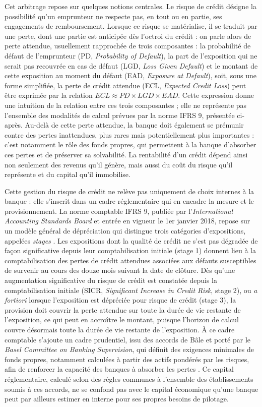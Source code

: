 Cet arbitrage repose sur quelques notions centrales. Le risque de crédit désigne la possibilité qu'un emprunteur ne respecte pas, en tout ou en partie, ses engagements de remboursement. Lorsque ce risque se matérialise, il se traduit par une perte, dont une partie est anticipée dès l'octroi du crédit : on parle alors de perte attendue, usuellement rapprochée de trois composantes : la probabilité de défaut de l'emprunteur (PD, \emph{Probability of Default}), la part de l'exposition qui ne serait pas recouvrée en cas de défaut (LGD, \emph{Loss Given Default}) et le montant de cette exposition au moment du défaut (EAD, \emph{Exposure at Default}), soit, sous une forme simplifiée, la perte de crédit attendue (ECL, \emph{Expected Credit Loss}) peut être exprimée par la relation $ECL \approx PD \times LGD \times EAD$. Cette expression donne une intuition de la relation entre ces trois composantes ; elle ne représente pas l'ensemble des modalités de calcul prévues par la norme IFRS 9, présentée ci-après. Au-delà de cette perte attendue, la banque doit également se prémunir contre des pertes inattendues, plus rares mais potentiellement plus importantes : c'est notamment le rôle des fonds propres, qui permettent à la banque d'absorber ces pertes et de préserver sa solvabilité. La rentabilité d'un crédit dépend ainsi non seulement des revenus qu'il génère, mais aussi du coût du risque qu'il représente et du capital qu'il immobilise.

Cette gestion du risque de crédit ne relève pas uniquement de choix internes à la banque : elle s'inscrit dans un cadre réglementaire qui en encadre la mesure et le provisionnement. La norme comptable \textsc{IFRS 9}, publiée par l'\textit{International Accounting Standards Board} et entrée en vigueur le 1er janvier 2018, repose sur un modèle général de dépréciation qui distingue trois catégories d'expositions, appelées \emph{stages} \parencite{IASB2014IFRS9}. Les expositions dont la qualité de crédit ne s'est pas dégradée de façon significative depuis leur comptabilisation initiale (stage 1) donnent lieu à la comptabilisation des pertes de crédit attendues associées aux défauts susceptibles de survenir au cours des douze mois suivant la date de clôture. Dès qu'une augmentation significative du risque de crédit est constatée depuis la comptabilisation initiale (SICR, \emph{Significant Increase in Credit Risk}, stage 2), ou \emph{a fortiori} lorsque l'exposition est dépréciée pour risque de crédit (stage 3), la provision doit couvrir la perte attendue sur toute la durée de vie restante de l'exposition, ce qui peut en accroître le montant, puisque l'horizon de calcul couvre désormais toute la durée de vie restante de l'exposition. À ce cadre comptable s'ajoute un cadre prudentiel, issu des accords de Bâle et porté par le \textit{Basel Committee on Banking Supervision}, qui définit des exigences minimales de fonds propres, notamment calculées à partir des actifs pondérés par les risques, afin de renforcer la capacité des banques à absorber les pertes \parencite{BCBS2017Basel3}. Ce capital réglementaire, calculé selon des règles communes à l'ensemble des établissements soumis à ces accords, ne se confond pas avec le capital économique qu'une banque peut par ailleurs estimer en interne pour ses propres besoins de pilotage.

